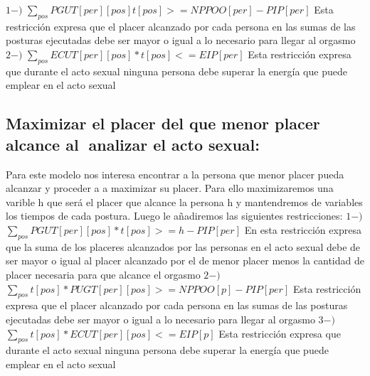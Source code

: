 \documentclass{llncs}
\begin{document}
$1-)$ $\sum_{pos} PGUT[per][pos]t[pos] >= NPPOO[per] - PIP[per]$
\newline
\newline
Esta restricción expresa que el placer alcanzado por cada persona en las sumas de las posturas ejecutadas debe ser mayor o igual a lo necesario para llegar al orgasmo
\newline
\newline
$2-)$ $\sum_{pos} ECUT[per][pos]*t[pos] <= EIP[per]$
\newline
\newline
Esta restricción expresa que durante el acto sexual ninguna persona debe superar la energía que puede emplear en el acto sexual


\subsection{Maximizar el placer del que menor placer alcance al analizar el acto sexual:}
Para este modelo nos interesa encontrar a la persona que menor placer pueda alcanzar y proceder a a maximizar su placer. Para ello maximizaremos una varible h que será el placer que alcance la persona h y mantendremos de variables los tiempos de cada postura.
\newline
\newline
Luego le añadiremos las siguientes restricciones:
\newline
\newline
$1-)$ $\sum_{pos} PGUT[per][pos]*t[pos] >= h - PIP[per]$
\newline
\newline
En esta restricción expresa que la suma de los placeres alcanzados por las personas en el acto sexual debe de ser mayor o igual al placer alcanzado por el de menor placer menos la cantidad de placer necesaria para que alcance el orgasmo
\newline
\newline
$2-)$ $\sum_{pos} t[pos]*PUGT[per][pos] >= NPPOO[p] - PIP[per]$
\newline
\newline
Esta restricción expresa que el placer alcanzado por cada persona en las sumas de las posturas ejecutadas debe ser mayor o igual a lo necesario para llegar al orgasmo
\newline
\newline
$3-)$ $\sum_{pos} t[pos]*ECUT[per][pos] <= EIP[p]$
\newline
\newline
Esta restricción expresa que durante el acto sexual ninguna persona debe superar la energía que puede emplear en el acto sexual
\end{document}
